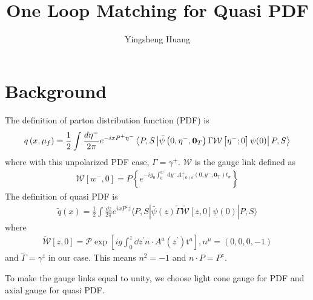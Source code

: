 \documentclass{article}
\title{One Loop Matching for Quasi PDF}
\author{Yingsheng Huang}
\begin{document}
\maketitle
\tableofcontents
\clearpage
\section{Background}
The definition of parton distribution function (PDF) is
\begin{align}
	q\left(x, \mu_{f}\right)=\frac{1}{2} \int \frac{d \eta^{-}}{2 \pi} e^{-i x P^{+} \eta^{-}}\left\langle P, S\left|\bar{\psi}\left(0,\eta^{-},\vb{0}_{T}\right) \Gamma \mathcal{W}\left[\eta^{-} ; 0\right] \psi(0)\right| P, S\right\rangle
\end{align}
where with this unpolarized PDF case, $\Gamma=\gamma^+$. $\mathcal{W}$ is the gauge link defined as\cite{Collins2009}
\begin{align}
	\mathcal{W}\left[w^{-}, 0\right]=P\left\{e^{-i g_{0} \int_{0}^{w^{-}} \mathrm{d} y^{-} A_{(0) \sigma}^{+}\left(0, y^{-}, \boldsymbol{0}_{\mathrm{T}}\right) t_{\sigma}}\right\}
\end{align}
The definition of quasi PDF is
\begin{align}
	\tilde{q}(x)=\frac{1}{2} \int \frac{\dd z}{2 \pi} e^{i x P^{z} z}\langle P, S|\bar{\psi}(z) \tilde{\Gamma} \tilde{\mathcal{W}}[z, 0] \psi(0)| P, S\rangle
\end{align}
where
\begin{align}
	\tilde{\mathcal{W}}\left[z, 0\right]=\mathcal{P} \exp \left[i g \int_{0}^{z} \dd z^{\prime} n \cdot A^{a}\left(z^{\prime}\right) \mathrm{t}^{a}\right], n^\mu=(0,0,0,-1)
\end{align}
and $\tilde{\Gamma}=\gamma^z$ in our case. This means $n^2=-1$ and $n\cdot P=P^z$. 

To make the gauge links equal to unity, we choose light cone gauge for PDF and axial gauge for quasi PDF.

\clearpage
\end{document}
